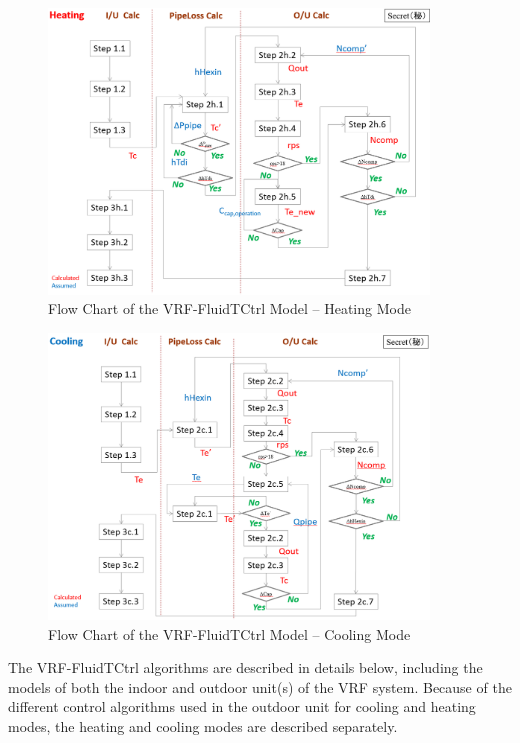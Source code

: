 \begin{figure}[hbtp] %
\centering
\includegraphics[width=0.9\textwidth, height=0.9\textheight, keepaspectratio=true]{media/VRF-FluidTCtrl-3a.png}
\caption{Flow Chart of the VRF-FluidTCtrl Model -- Heating Mode \label{fig:vrf-fluid-t-ctrl-3a}}
\end{figure}

\begin{figure}[hbtp] %
\centering
\includegraphics[width=0.9\textwidth, height=0.9\textheight, keepaspectratio=true]{media/VRF-FluidTCtrl-3b.png}
\caption{Flow Chart of the VRF-FluidTCtrl Model -- Cooling Mode \label{fig:vrf-fluid-t-ctrl-3b}}
\end{figure}

The VRF-FluidTCtrl algorithms are described in details below, including the models of both the indoor and outdoor unit(s) of the VRF system. Because of the different control algorithms used in the outdoor unit for cooling and heating modes, the heating and cooling modes are described separately.

